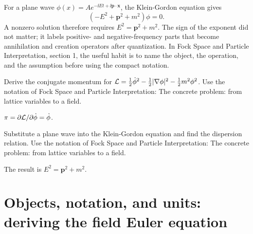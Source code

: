 \begin{example}
For a plane wave \(\phi(x)=Ae^{-\ii Et+\ii\bm p\cdot\bm x}\), the Klein-Gordon equation gives
\[
  (-E^2+\bm p^2+m^2)\phi=0.
\]
A nonzero solution therefore requires \(E^2=\bm p^2+m^2\).  The sign of the exponent did not matter; it labels positive- and negative-frequency parts that become annihilation and creation operators after quantization.  In Fock Space and Particle Interpretation, section 1, the useful habit is to name the object, the operation, and the assumption before using the compact notation.
\end{example}



\begin{exercise}
Derive the conjugate momentum for \(\mathcal L=\frac12\dot\phi^2-\frac12|\nabla\phi|^2-\frac12m^2\phi^2\).  Use the notation of Fock Space and Particle Interpretation: The concrete problem: from lattice variables to a field.
\begin{answer}
\(\pi=\partial\mathcal L/\partial\dot\phi=\dot\phi\).
\end{answer}
\end{exercise}

\begin{exercise}
Substitute a plane wave into the Klein-Gordon equation and find the dispersion relation.  Use the notation of Fock Space and Particle Interpretation: The concrete problem: from lattice variables to a field.
\begin{answer}
The result is \(E^2=\bm p^2+m^2\).
\end{answer}
\end{exercise}



\section{Objects, notation, and units: deriving the field Euler equation}













